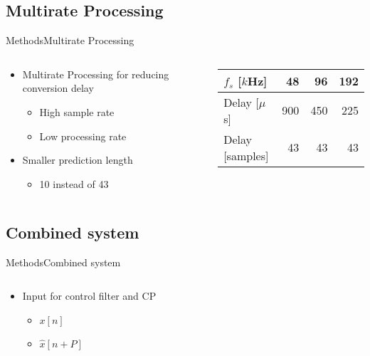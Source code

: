 \subsection{Multirate Processing}
\begin{frame}{Methods}{Multirate Processing}	
\begin{columns}
	\begin{column}{0.5\textwidth}
		\begin{itemize}
			\item Multirate Processing for reducing conversion delay
			\begin{itemize}
				\item High sample rate
				\item Low processing rate
			\end{itemize}
			\item Smaller prediction length
			\begin{itemize}
				\item 10 instead of 43
			\end{itemize}
		\end{itemize}
	\end{column}
	\begin{column}{0.5\textwidth} 
		\begin{table}[H]
			\centering
			\begin{tabular}{|l|r|r|r|}
				\hline
				$f_s$ {[}$k$Hz{]} & 48 & 96 & 192 \\ \hline
				Delay {[}$\mu$s{]} & 900 & 450 & 225 \\ \hline
				Delay {[}samples{]} & 43 & 43 & 43 \\ \hline
			\end{tabular}
		\end{table}
	\end{column}
\end{columns}
\end{frame}




\subsection{Combined system}
\begin{frame}{Methods}{Combined system}	
\begin{columns}
	\begin{column}{0.4\textwidth}
		\begin{itemize}
			\item Input for control filter and CP
			\begin{itemize}
			\item $x[n]$
			\item $\hat{x}[n+P]$
			\end{itemize}
		\end{itemize}
	\end{column}
	\begin{column}{0.6\textwidth} 
		\resizebox{0.9\columnwidth}{!}{		
			}
	\end{column}
\end{columns}
\end{frame}





